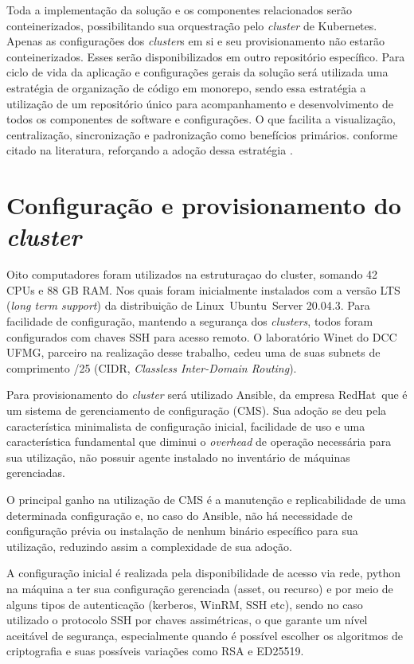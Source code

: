 Toda a implementação da solução e os componentes relacionados serão conteinerizados, possibilitando  sua orquestração pelo  \emph{cluster} de Kubernetes\textregistered. Apenas as configurações dos  \emph{cluster}s em si e seu provisionamento não estarão conteinerizados. Esses serão disponibilizados em outro repositório específico. 
Para ciclo de vida da aplicação e configurações gerais da solução será utilizada uma estratégia de organização de código em monorepo, sendo essa estratégia a utilização de um repositório único para acompanhamento e desenvolvimento de todos os componentes de software e configurações. O que facilita a visualização, centralização, sincronização e padronização como benefícios primários. conforme citado na literatura, reforçando a adoção dessa estratégia \cite{brito_monorepos_2018}.


\section{Configuração e provisionamento do  \emph{cluster}}

Oito computadores foram utilizados na estruturaçao do cluster, somando 42 CPUs e 88 GB RAM. Nos quais foram inicialmente instalados com a versão LTS (\emph{long term support}) da distribuição de Linux\textregistered \ Ubuntu\textregistered \ Server {20.04.3}. Para facilidade de configuração, mantendo a segurança dos \emph{clusters}, todos foram configurados com chaves SSH para acesso remoto. O laboratório Winet do DCC UFMG, parceiro na realização desse trabalho, cedeu uma de suas subnets de comprimento /25 (CIDR, \emph{Classless Inter-Domain Routing}). 

Para provisionamento do \emph{cluster} será utilizado Ansible\textregistered, da empresa RedHat\textregistered \ que é  um sistema de gerenciamento de configuração (CMS). Sua adoção se deu pela característica minimalista de configuração inicial, facilidade de uso e uma característica fundamental que diminui o \emph{overhead} de operação necessária para sua utilização, não possuir agente instalado no inventário de máquinas gerenciadas. 

O principal ganho na utilização de CMS é a manutenção e replicabilidade de uma determinada configuração e, no caso do Ansible, não há necessidade de configuração prévia ou instalação de nenhum binário específico para sua utilização, reduzindo assim a complexidade de sua adoção.

A configuração inicial é realizada pela disponibilidade de acesso via rede, python na máquina a ter sua configuração gerenciada (asset, ou recurso) e por meio de alguns tipos de autenticação (kerberos, WinRM, SSH etc), sendo no caso utilizado o protocolo SSH \cite{noauthor_rfc4254_nodate} por chaves assimétricas, o que garante um nível aceitável de segurança, especialmente quando é possível escolher os algoritmos de criptografia e suas possíveis variações como RSA e ED25519.

